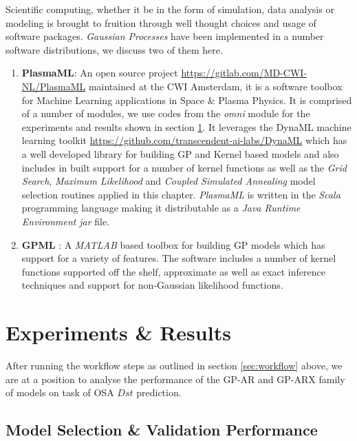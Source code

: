 \documentclass{article}
\begin{document}
Scientific computing, whether it be in the form of simulation, data
analysis or modeling is brought to fruition through well thought
choices and usage of software packages. \emph{Gaussian Processes} have
been implemented in a number software distributions, we discuss two of
them here.

\begin{enumerate}

\item \textbf{PlasmaML}: An open source project
  \url{https://gitlab.com/MD-CWI-NL/PlasmaML} maintained at the CWI
  Amsterdam, it is a software toolbox for Machine Learning
  applications in Space \& Plasma Physics. It is comprised of a number
  of modules, we use codes from the \textit{omni} module for the
  experiments and results shown in section \ref{sec:results}. It
  leverages the DynaML machine learning toolkit
  \url{https://github.com/transcendent-ai-labs/DynaML} which has a
  well developed library for building GP and Kernel based models and
  also includes in built support for a number of kernel functions as
  well as the \emph{Grid Search}, \emph{Maximum Likelihood} and
  \emph{Coupled Simulated Annealing} model selection routines applied
  in this chapter. \textit{PlasmaML} is written in the \textit{Scala}
  programming language making it distributable as a \emph{Java Runtime
    Environment} \textit{jar} file.

\item \textbf{GPML} \citep{GPML}: A \emph{MATLAB} based toolbox for
  building GP models which has support for a variety of features. The
  software includes a number of kernel functions supported off the
  shelf, approximate as well as exact inference techniques and support
  for non-Gaussian likelihood functions. 
\end{enumerate}

\section{Experiments \& Results}\label{sec:results}

After running the workflow steps as outlined in section
\ref{sec:workflow} above, we are at a position to analyse the
performance of the GP-AR and GP-ARX family of models on task of OSA
$Dst$ prediction.

\subsection*{Model Selection \& Validation Performance}
\end{document}
